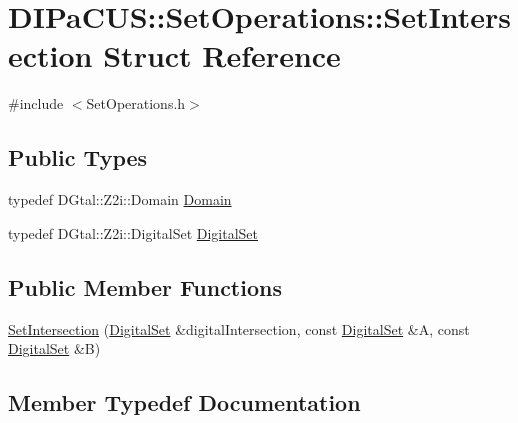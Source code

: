 \hypertarget{structDIPaCUS_1_1SetOperations_1_1SetIntersection}{}\section{D\+I\+Pa\+C\+US\+:\+:Set\+Operations\+:\+:Set\+Intersection Struct Reference}
\label{structDIPaCUS_1_1SetOperations_1_1SetIntersection}


{\ttfamily \#include $<$Set\+Operations.\+h$>$}

\subsection*{Public Types}
\begin{DoxyCompactItemize}
\item 
typedef D\+Gtal\+::\+Z2i\+::\+Domain \mbox{\hyperlink{structDIPaCUS_1_1SetOperations_1_1SetIntersection_a8b92555f5234943ea064906c2590d17c}{Domain}}
\item 
typedef D\+Gtal\+::\+Z2i\+::\+Digital\+Set \mbox{\hyperlink{structDIPaCUS_1_1SetOperations_1_1SetIntersection_a30ae8d2238ec7e463abf64bba651e28f}{Digital\+Set}}
\end{DoxyCompactItemize}
\subsection*{Public Member Functions}
\begin{DoxyCompactItemize}
\item 
\mbox{\hyperlink{structDIPaCUS_1_1SetOperations_1_1SetIntersection_a52d3fd52c21e7eb9cd4d5ce16cf80fbb}{Set\+Intersection}} (\mbox{\hyperlink{structDIPaCUS_1_1SetOperations_1_1SetIntersection_a30ae8d2238ec7e463abf64bba651e28f}{Digital\+Set}} \&digital\+Intersection, const \mbox{\hyperlink{structDIPaCUS_1_1SetOperations_1_1SetIntersection_a30ae8d2238ec7e463abf64bba651e28f}{Digital\+Set}} \&A, const \mbox{\hyperlink{structDIPaCUS_1_1SetOperations_1_1SetIntersection_a30ae8d2238ec7e463abf64bba651e28f}{Digital\+Set}} \&B)
\end{DoxyCompactItemize}


\subsection{Member Typedef Documentation}
\mbox{\label{structDIPaCUS_1_1SetOperations_1_1SetIntersection_a30ae8d2238ec7e463abf64bba651e28f}} 
